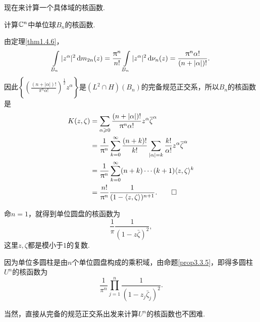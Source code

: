 现在来计算一个具体域的核函数.
\begin{example}\label{exa3.3.7}
	计算$\MC^n$中单位球$B_n$的核函数.
\end{example}
\begin{solution}
	由定理\ref{thm1.4.6}，
	\[\int\limits_{B_n}|z^\alpha|^2\dif m_{2n}(z)=\frac{\pi^n}{n!}\int\limits_{B_n}|z^\alpha|^2\dif \nu_{n}(z)=\frac{\pi^n \alpha!}{(n+|\alpha|)!}.\]
	因此$\left\{\left(\frac{(n+|\alpha|)!}{\pi^n\alpha!}\right)^{\frac12} z^\alpha\right\}$是$(L^2\cap H)(B_n)$的完备规范正交系，所以$B_n$的核函数是
	\begin{align*}
		K(z,\zeta)
		&=\sum_{\alpha\ge0}\frac{(n+|\alpha|)!}{\pi^n\alpha!}z^\alpha \bar{\zeta}^\alpha\\
		&=\frac1{\pi^n}\sum_{k=0}^{\infty}\frac{(n+k)!}{k!}\sum_{|\alpha|=k} \frac{k!}{\alpha!}z^\alpha\bar{\zeta}^\alpha\\
		&=\frac1{\pi^n}\sum_{k=0}^{\infty}(n+k)\cdots(k+1)\langle z,\zeta\rangle^k\\
		&=\frac{n!}{\pi^n}\frac1{(1-\langle z,\zeta\rangle)^{n+1}}.\qedhere
	\end{align*}
\end{solution}
命$n=1$，就得到单位圆盘的核函数为
\[\frac1{\pi}\frac1{(1-z\bar{\zeta})^2},\]
这里$z,\zeta$都是模小于$1$的复数.

因为单位多圆柱是由$n$个单位圆盘构成的乘积域，由命题\ref{prop3.3.5}，即得多圆柱$U^n$的核函数为
\[\frac1{\pi^n}\prod_{j=1}^{n}\frac1{(1-z_j\bar{\zeta}_j)^2}.\]

当然，直接从完备的规范正交系出发来计算$U^n$的核函数也不困难.
